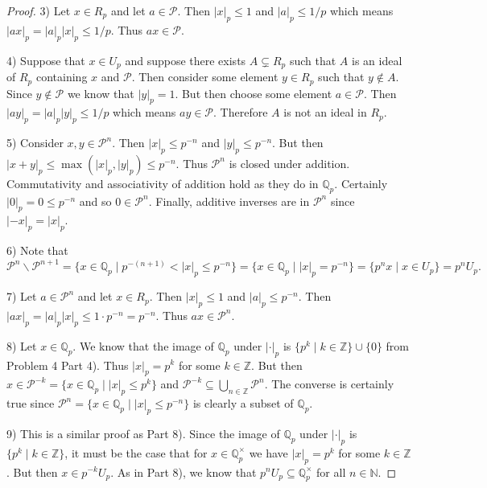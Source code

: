 \documentclass{article}
\begin{document}
\begin{flushleft}
\begin{proof}
3) Let $x \in R_p$ and let $a \in \mathcal{P}$. Then $|x|_p \leq 1$ and $|a|_p \leq 1/p$ which means $|ax|_p = |a|_p |x|_p \leq 1/p$. Thus $ax \in \mathcal{P}$.\newline

4) Suppose that $x \in U_p$ and suppose there exists $A \subsetneq R_p$ such that $A$ is an ideal of $R_p$ containing $x$ and $\mathcal{P}$. Then consider some element $y \in R_p$ such that $y \notin A$. Since $y \notin \mathcal{P}$ we know that $|y|_p = 1$. But then choose some element $a \in \mathcal{P}$. Then $|ay|_p = |a|_p |y|_p \leq 1/p$ which means $ay \in \mathcal{P}$. Therefore $A$ is not an ideal in $R_p$.\newline

5) Consider $x, y \in \mathcal{P}^n$. Then $|x|_p \leq p^{-n}$ and $|y|_p \leq p^{-n}$. But then $|x + y|_p \leq \max ( |x|_p, |y|_p ) \leq p^{-n}$. Thus $\mathcal{P}^n$ is closed under addition. Commutativity and associativity of addition hold as they do in $\mathbb{Q}_p$. Certainly $|0|_p = 0 \leq p^{-n}$ and so $0 \in \mathcal{P}^n$. Finally, additive inverses are in $\mathcal{P}^n$ since $|-x|_p = |x|_p$.\newline

6) Note that
\[
\mathcal{P}^n \backslash \mathcal{P}^{n+1} = \{x \in \mathbb{Q}_p \mid p^{-(n+1)} < |x|_p \leq p^{-n}\} = \{x \in \mathbb{Q}_p \mid |x|_p = p^{-n} \} = \{p^n x \mid x \in U_p\} = p^n U_p.
\]\newline

7) Let $a \in \mathcal{P}^n$ and let $x \in R_p$. Then $|x|_p \leq 1$ and $|a|_p \leq p^{-n}$. Then $|ax|_p = |a|_p |x|_p \leq 1 \cdot p^{-n} = p^{-n}$. Thus $ax \in \mathcal{P}^n$.\newline

8) Let $x \in \mathbb{Q}_p$. We know that the image of $\mathbb{Q}_p$ under $| \cdot |_p$ is $\{p^k \mid k \in \mathbb{Z}\} \cup \{0\}$ from Problem 4 Part 4). Thus $|x|_p = p^k$ for some $k \in \mathbb{Z}$. But then $x \in \mathcal{P}^{-k} = \{x \in \mathbb{Q}_p \mid |x|_p \leq p^k\}$ and $\mathcal{P}^{-k} \subseteq \bigcup_{n \in \mathbb{Z}} \mathcal{P}^n$. The converse is certainly true since $\mathcal{P}^n = \{x \in \mathbb{Q}_p \mid |x|_p \leq p^{-n}\}$ is clearly a subset of $\mathbb{Q}_p$.\newline

9) This is a similar proof as Part 8). Since the image of $\mathbb{Q}_p$ under $| \cdot |_p$ is $\{p^k \mid k \in \mathbb{Z} \}$, it must be the case that for $x \in \mathbb{Q}^{\times}_p$ we have $|x|_p = p^k$ for some $k \in \mathbb{Z}$. But then $x \in p^{-k} U_p$. As in Part 8), we know that $p^n U_p \subseteq \mathbb{Q}^{\times}_p$ for all $n \in \mathbb{N}$.
\end{proof}

\end{flushleft}
\end{document}
